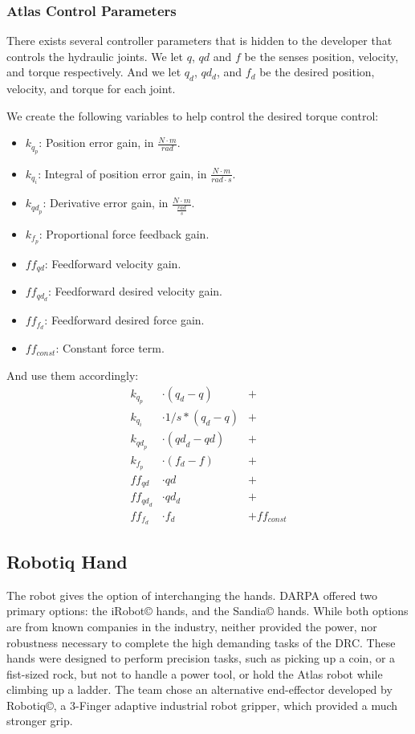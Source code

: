 \documentclass[12pt]{report}
\begin{document}
\pagebreak


\subsubsection{Atlas Control Parameters}
There exists several controller parameters that is hidden to the developer that controls the hydraulic joints. We let $q$, $qd$ and $f$ be the senses position, velocity, and torque respectively. And we let $q_d$, $qd_d$, and $f_d$ be the desired position, velocity, and torque for each joint.

We create the following variables to help control the desired torque control:

\begin{itemize}
\item $k_{q_p}$: Position error gain, in $\frac{N \cdot m}{rad}$.
\item $k_{q_i} $: Integral of position error gain, in $\frac{N \cdot m}{rad \cdot s}$.
\item $k_{{qd}_p}$: Derivative error gain, in $\frac{N \cdot m}{\frac{rad}{s}}$.
\item $k_{f_p}$: Proportional force feedback gain.
\item ${ff}_{qd}$: Feedforward velocity gain.
\item ${ff}_{{qd}_d}$: Feedforward desired velocity gain.
\item ${ff}_{f_d}$: Feedforward desired force gain.
\item ${ff}_{const}$: Constant force term.
\end{itemize}

And use them accordingly: 
\begin{align*}
k_{q_p} &\cdot ( q_d - q ) &+\\
k_{q_i} &\cdot 1/s * ( q_d - q ) &+\\
k_{{qd}_p} &\cdot ( {qd}_d - qd ) &+\\
k_{f_p} &\cdot ( f_d - f ) &+\\
{ff}_{qd} &\cdot qd &+\\
{ff}_{{qd}_d} &\cdot qd_d &+\\
{ff}_{f_d} &\cdot f_d &+ {ff}_{const}
\end{align*}

\subsection{Robotiq Hand}

The robot gives the option of interchanging the hands. DARPA offered two primary options: the iRobot© hands, and the Sandia© hands. While both options are from known companies in the industry, neither provided the power, nor robustness necessary to complete the high demanding tasks of the DRC. These hands were designed to perform precision tasks, such as picking up a coin, or a fist-sized rock, but not to handle a power tool, or hold the Atlas robot while climbing up a ladder. The team chose an alternative end-effector developed by Robotiq©, a 3-Finger adaptive industrial robot gripper, which provided a much stronger grip. 
\end{document}
